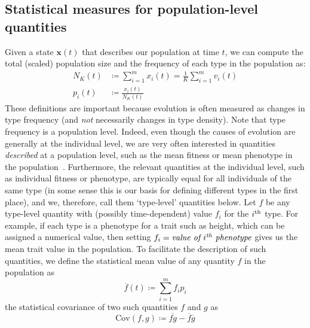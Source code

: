 \subsection{Statistical measures for population-level quantities}\label{sec_stat_measures}
Given a state $\mathbf{x}(t)$ that describes our population at time $t$, we can compute the total (scaled) population size and the frequency of each type in the population as:
\begin{equation}
\label{nD_tot_pop_and_prop_inds_defn}
\begin{aligned}
N_{K}(t) &\coloneqq \sum\limits_{i=1}^{m}x_i(t) = \frac{1}{K}\sum\limits_{i=1}^{m}v_i(t)\\
p_i(t) &\coloneqq \frac{x_i(t)}{N_{K}(t)}
\end{aligned}
\end{equation}
These definitions are important because evolution is often measured as changes in type frequency (and \emph{not} necessarily changes in type density). Note that type frequency is a population level. Indeed, even though the causes of evolution are generally at the individual level, we are very often interested in quantities \emph{described} at a population level, such as the mean fitness or mean phenotype in the population~\citep{bourrat_evolution_2019}. Furthermore, the relevant quantities at the individual level, such as individual fitness or phenotype, are typically equal for all individuals of the same type (in some sense this is our basis for defining different types in the first place), and we, therefore, call them `type-level' quantities below. Let $f$ be any type-level quantity with (possibly time-dependent) value $f_i$ for the $i\textsuperscript{th}$ type. For example, if each type is a phenotype for a trait such as height, which can be assigned a numerical value, then setting $f_i = \textit{value of $i\textsuperscript{th}$ phenotype}$ gives us the mean trait value in the population. To facilitate the description of such quantities, we define the statistical mean value of any quantity $f$ in the population as
\begin{equation}
\label{nD_mean}
\overline{f}(t) \coloneqq \sum\limits_{i=1}^{m}f_ip_{i}
\end{equation}
the statistical covariance of two such quantities $f$ and $g$ as
\begin{equation}
\label{nD_cov}
\textrm{Cov}(f,g) \coloneqq \overline{fg} - \overline{f}\overline{g}
\end{equation}
